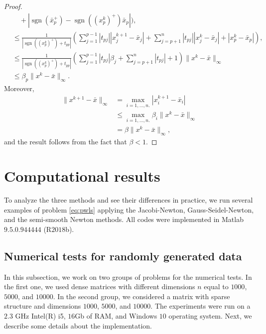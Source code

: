 \documentclass[11pt]{article}
\DeclareMathOperator{\sgn}{sgn}
\newcommand{\NN}{\mathbb{N}}
\begin{document}
\begin{proof}
\begin{align*}
&\quad + |\sgn(\bar x_p^+)-\sgn((x^{k}_p)^+)\bar x_p| \Biggr),\\ &\leq \frac{1}{|\sgn((x^{k}_p)^+)+t_{pp}|}\left( \sum_{j=1}^{p-1} |t_{pj}||x^{k+1}_j-\bar x_j| + \sum_{j=p+1}^n |t_{pj}||x^{k}_j-\bar x_j| +|x^{k}_p-\bar x_p| \right),\\
&\leq \frac{1}{|\sgn((x^{k}_p)^+)+t_{pp}|}\left(\sum_{j=1}^{p-1}|t_{pj}|\beta_j+\sum_{j=p+1}^n|t_{pj}|+1 \right)\|x^{k}-\bar x\|_{\infty}\\
&\le \beta_p\|x^{k}-\bar x\|_{\infty}.
\end{align*}
Moreover,
\begin{align*}
\| x^{k+1}-\bar x \|_{\infty} &= \max_{i=1,\dots,n.}|x^{k+1}_i-\bar x_i|\\
&\leq \max_{i=1,\dots,n.}\beta_i\|x^{k}-\bar x\|_{\infty}\\
&= \beta\|x^{k}-\bar x\|_{\infty},
\end{align*} and the result follows from the fact that $\beta<1$.
\end{proof}

\section{Computational results} 
\label{sec:computationalresults}

To analyze the three methods and see their differences in practice, we run several examples of problem \eqref{eq:pwls} applying the Jacobi-Newton, Gauss-Seidel-Newton, and the semi-smooth Newton methods. All codes were implemented in Matlab $9.5.0.944444$ (R$2018$b). 

\subsection{Numerical tests for randomly generated data} 
\label{sec:computationalresults}

In this subsection, we work on two groups of problems for the numerical tests. In the first one, we used dense matrices with different dimensions $n$ equal to $1000$, $5000$, and $10000$. In the second group, we considered a matrix with sparse structure and dimensions $1000$, $5000$, and $10000$. The experiments were run on a $2.3$ GHz Intel(R) i5, $16$Gb of RAM, and Windows $10$ operating system. Next, we describe some details about the implementation. 
\end{document}
